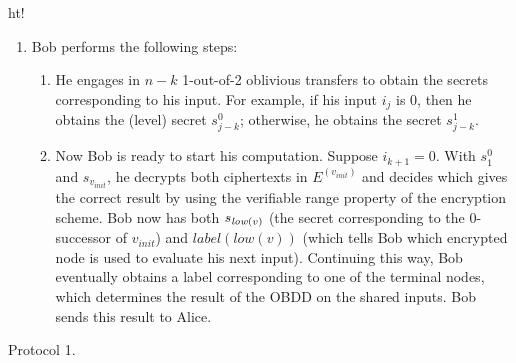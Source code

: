 \begin{center}
\begin{boxfig*}{ht!}
{\begin{enumerate}
\begin{enumerate}
Lastly, there are two terminal nodes of the form $(b,label(t_b))$ for
$b=0$ or $1$. Recall that $OBDD(f)$ has two terminal nodes, denoted as
$0$ and $1$, that are at level $n$.

\item Once Alice is done encrypting, she sends to Bob the encryption
of all nodes whose level is between $k$ and $n$ and the secret
$s_{v_{init}}$ corresponding to node $v_{init}$ at level $k$. We called
this the garbled OBDD.

\end{enumerate}

\item Bob performs the following steps:
\begin{enumerate}
\item He engages in $n-k$ 1-out-of-2 oblivious transfers to obtain the
secrets corresponding to his input. For example, if his input $i_j$ is
$0$, then he obtains the (level) secret $s_{j-k}^0$; otherwise, he
obtains the secret $s_{j-k}^1$.

\item Now Bob is ready to start his computation. Suppose
$i_{k+1}=0$. With $s_{1}^0$ and $s_{v_{init}}$, he decrypts both
ciphertexts in $E^{(v_{init})}$ and decides which gives the correct
result by using the verifiable range property of the encryption
scheme. Bob now has both $s_{{\it low}(v)}$ (the secret corresponding
to the $0$-successor of $v_{init}$) and $label(low(v))$ (which tells
Bob which encrypted node is used to evaluate his next
input). Continuing this way, Bob eventually obtains a label
corresponding to one of the terminal nodes, which determines the
result of the OBDD on the shared inputs. Bob sends this result to
Alice.
\end{enumerate}

\end{enumerate}
}
\vspace{-0.1cm}
\caption{\label{protbasicobdd} Protocol 1.}
\end{boxfig*}
\end{center}

